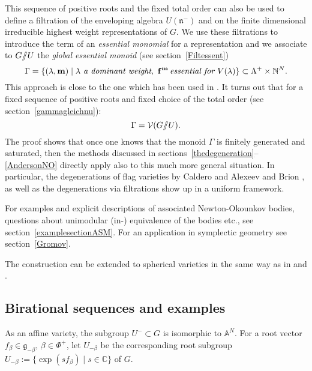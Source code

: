\documentclass{emsprocart}
\theoremstyle{definition}
\begin{document}
This sequence of positive roots and the fixed total order can also be used to define a filtration
of the enveloping algebra $U(\mathfrak n^-)$ and on the finite dimensional irreducible highest weight 
representations of $G$. We use these filtrations to introduce the term of an {\it essential monomial}
for a representation and we associate to 
$G/\hskip -3.5pt/U$ the {\it global essential monoid} (see section~\ref{Filtessent})
$$
\Gamma= \{(\lambda,\mathbf m)\mid \lambda \hbox{\it\ a dominant weight},\ \mathbf f^{\mathbf m}
\hbox{\it \,essential for $V(\lambda)$}\} \subset \Lambda^+\times \mathbb N^N.
$$
This approach is close to the one which has been used in \cite{F1,FFL2,FFL3,FFL1}. It turns out that for a 
fixed sequence of positive roots and fixed choice of the total order (see section~\ref{gammagleichnu}): 
$$
\Gamma={\cal V}(G/\hskip -3.5pt/U).
$$
The proof shows that once one knows that the monoid $\Gamma$ is finitely generated and saturated,
then the methods discussed in sections~\ref{thedegeneration}--\ref{AndersonNO} directly apply also 
to this much more general situation.  %
In particular, the degenerations of flag varieties by Caldero \cite{Ca1} and Alexeev and Brion \cite{AB},
as well as the degenerations via filtrations \cite{FFL1} show up in a uniform framework.

For examples and explicit descriptions of associated Newton-Okounkov bodies, 
questions about unimodular (in-) equivalence of the bodies etc., see section~\ref{examplesectionASM}. 
For an application in symplectic geometry see section~\ref{Gromov}.

The construction can be extended to spherical varieties in the same way as in \cite{AB} and \cite{K1}. 

\subsection{Birational sequences and examples}\label{birat}
As an affine variety, the subgroup $U^-\subset G$ is isomorphic
to $\mathbb A^N$. For a root vector $f_{\beta}\in {\mathfrak g}_{-\beta}$,
$\beta\in\Phi^+$, let $U_{-\beta}$
be the corresponding root subgroup $U_{-\beta}:=\{\exp(s f_{\beta})\mid s\in \mathbb C\}$ of $G$.
\end{document}
